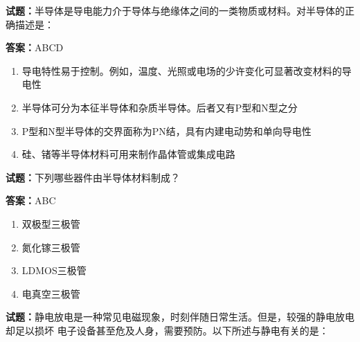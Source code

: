 \documentclass{ctexbook}
\begin{document}




\vspace{1em}

\textbf{试题：}半导体是导电能力介于导体与绝缘体之间的一类物质或材料。对半导体的正确描述是： 

\textbf{答案：}ABCD 

\begin{enumerate}[leftmargin=3em]
  \item 导电特性易于控制。例如，温度、光照或电场的少许变化可显著改变材料的导电性 

  \item 半导体可分为本征半导体和杂质半导体。后者又有P型和N型之分 

  \item P型和N型半导体的交界面称为PN结，具有内建电动势和单向导电性 

  \item 硅、锗等半导体材料可用来制作晶体管或集成电路 

\end{enumerate}





\vspace{1em}

\textbf{试题：}下列哪些器件由半导体材料制成？ 

\textbf{答案：}ABC 

\begin{enumerate}[leftmargin=3em]
  \item 双极型三极管 

  \item 氮化镓三极管 


  \item LDMOS三极管 

  \item 电真空三极管 

\end{enumerate}





\vspace{1em}

\textbf{试题：}静电放电是一种常见电磁现象，时刻伴随日常生活。但是，较强的静电放电却足以损坏
电子设备甚至危及人身，需要预防。以下所述与静电有关的是： 
\end{document}
